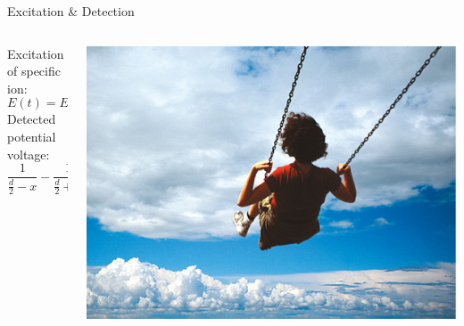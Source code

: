 \documentclass[t,compress,athserif,xcolor=pst,dvips]{beamer}
\begin{document}
	\begin{frame}[c]{Excitation \& Detection}
		\begin{columns}
			\begin{column}{5cm}
				Excitation of specific ion:
				$$E(t)=E_0\,\cos(\omega_0\,t)\,y$$
				\vspace{.25cm}
				Detected potential voltage:
				$$\frac{1}{\frac{d}{2}-x}-\frac{1}{\frac{d}{2}+x}$$
			\end{column}
			\begin{column}{5cm}
				\begin{overprint}
					\vspace{-1mm}
					\includegraphics[scale=.42]{swinghigh.eps}
				\end{overprint}
			\end{column}
		\end{columns}
	\end{frame}
	
\end{document}
